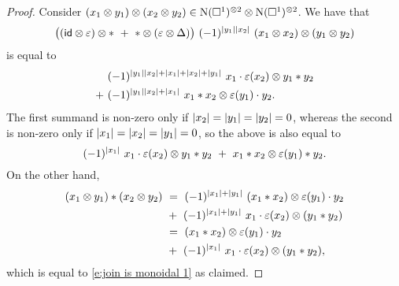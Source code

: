 \begin{proof}
	Consider $(x_1 \otimes y_1) \otimes (x_2 \otimes y_2) \in \operatorname{N}(\square^1)^{\otimes 2} \otimes \operatorname{N}(\square^1)^{\otimes 2}$.
	We have that
	\[
	\big((\id \otimes \varepsilon) \otimes \ast \ + \ \ast \otimes (\varepsilon \otimes \Delta)\big) \ (-1)^{\bars{y_1} \bars{x_2}} \ (x_1 \otimes x_2) \otimes (y_1 \otimes y_2)
	\]
	is equal to
	\begin{align*}
	& (-1)^{\lvert y_1\rvert \lvert x_2\rvert + \lvert x_1\rvert + \lvert x_2\rvert + \lvert y_1\rvert} \ x_1 \cdot \varepsilon(x_2) \otimes y_1 \ast y_2 \\ + \
	& (-1)^{\lvert y_1\rvert \lvert x_2\rvert + \lvert x_1\rvert} \ x_1 \ast x_2 \otimes \varepsilon(y_1) \cdot y_2.
	\end{align*}
	The first summand is non-zero only if $\lvert x_2\rvert = \lvert y_1\rvert = \lvert y_2\rvert = 0$, whereas the second is non-zero only if $\lvert x_1\rvert = \lvert x_2\rvert = \lvert y_1\rvert = 0$, so the above is also equal to
	\begin{equation} \label{e:join is monoidal 1}
	(-1)^{\lvert x_1\rvert} \ x_1 \cdot \varepsilon(x_2) \otimes y_1 \ast y_2 \ + \
	x_1 \ast x_2 \otimes \varepsilon(y_1) \ast y_2.
	\end{equation}
	On the other hand,
	\begin{align*}
	(x_1 \otimes y_1) \ast (x_2 \otimes y_2) \ & =\
	(-1)^{\lvert x_1\rvert + \lvert y_1\rvert} \ (x_1 \ast x_2) \otimes \varepsilon(y_1) \cdot y_2 \\ & +\
	(-1)^{\lvert x_1\rvert + \lvert y_1\rvert} \ x_1 \cdot \varepsilon(x_2) \otimes (y_1 \ast y_2) \\ \ & =\
	(x_1 \ast x_2) \otimes \varepsilon(y_1) \cdot y_2 \\ & +\
	(-1)^{\lvert x_1\rvert} \ x_1 \cdot \varepsilon(x_2) \otimes (y_1 \ast y_2),
	\end{align*}
	which is equal to \eqref{e:join is monoidal 1} as claimed.
\end{proof}

